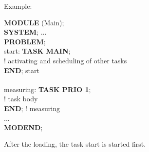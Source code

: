 Example:

\begin{tabbing}
{\bf MODULE} (Main); \= \\
{\bf SYSTEM}; ...    \> \\
{\bf PROBLEM};       \> \\
start:               \> {\bf TASK MAIN};\\
                     \> ! activating and scheduling of other tasks\\
                     \> {\bf END}; start\\
                     \> \\
measuring:           \> {\bf TASK PRIO 1};\\
                     \> ! task body \\
                     \> {\bf END}; ! measuring\\
...                  \> \\
{\bf MODEND};        \>
\end{tabbing}

After the loading, the task start is started first.

